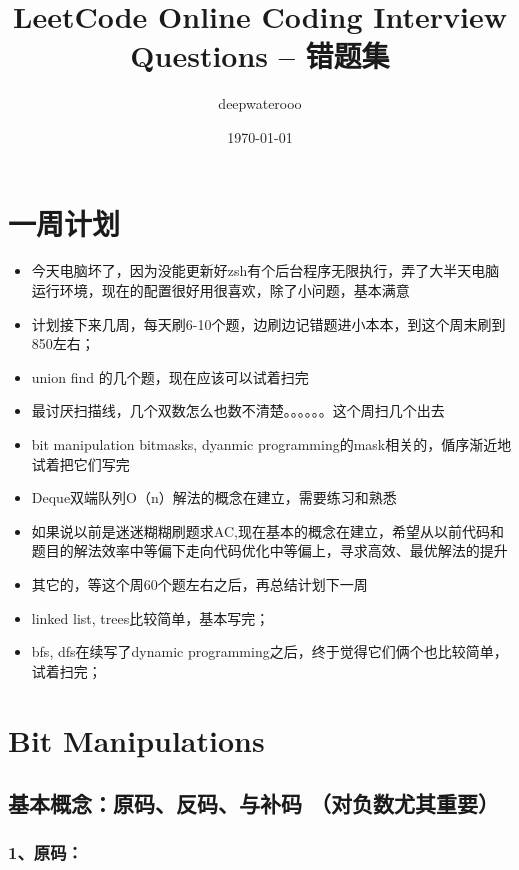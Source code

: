 \documentclass[9pt, b5paper]{article}
\author{deepwaterooo}
\date{\today}
\title{LeetCode Online Coding Interview Questions -- 错题集}
\begin{document}
\maketitle
\tableofcontents


\section{一周计划}
\label{sec-1}
\begin{itemize}
\item 今天电脑坏了，因为没能更新好zsh有个后台程序无限执行，弄了大半天电脑运行环境，现在的配置很好用很喜欢，除了小问题，基本满意

\item 计划接下来几周，每天刷6-10个题，边刷边记错题进小本本，到这个周末刷到850左右；

\item union find 的几个题，现在应该可以试着扫完
\item 最讨厌扫描线，几个双数怎么也数不清楚。。。。。。这个周扫几个出去
\item bit manipulation bitmasks, dyanmic programming的mask相关的，偱序渐近地试着把它们写完
\item Deque双端队列O（n）解法的概念在建立，需要练习和熟悉
\item 如果说以前是迷迷糊糊刷题求AC,现在基本的概念在建立，希望从以前代码和题目的解法效率中等偏下走向代码优化中等偏上，寻求高效、最优解法的提升

\item 其它的，等这个周60个题左右之后，再总结计划下一周

\item linked list, trees比较简单，基本写完；
\item bfs, dfs在续写了dynamic programming之后，终于觉得它们俩个也比较简单，试着扫完；
\end{itemize}


\section{Bit Manipulations}
\label{sec-2}
\subsection{基本概念：原码、反码、与补码 （对负数尤其重要）}
\label{sec-2-1}
\subsubsection{1、原码：}
\label{sec-2-1-1}
\end{document}
